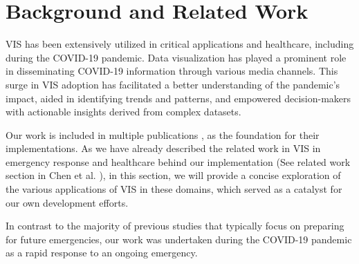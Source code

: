 \section{Background and Related Work}

\ac{VIS} has been extensively utilized in critical applications and healthcare, including during the COVID-19 pandemic.
Data visualization has played a prominent role in disseminating COVID-19 information through various media channels.
This surge in \ac{VIS} adoption has facilitated a better understanding of the pandemic's impact, aided in identifying trends and patterns, and empowered decision-makers with actionable insights derived from complex datasets.

Our work is included in multiple publications \cite{chen2022RAMPVIS,dykes2022Visualizationb,khan2022Propagating,rydow2023RAMPVIS}, as the foundation for their implementations.
As we have already described the related work in \ac{VIS} in emergency response and healthcare behind our implementation (See related work section in Chen et al. \cite{chen2022RAMPVIS}), in this section, we will provide a concise exploration of the various applications of \ac{VIS} in these domains, which served as a catalyst for our own development efforts.

In contrast to the majority of previous studies that typically focus on preparing for future emergencies, our work was undertaken during the COVID-19 pandemic as a rapid response to an ongoing emergency.
